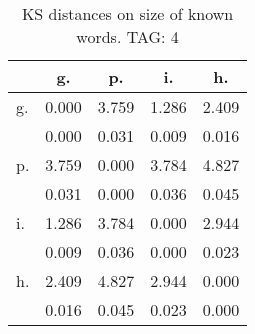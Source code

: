 \begin{table}[h!]
\begin{center}
\begin{tabular}{| l | c | c | c | c |}\hline
 & g. & p. & i. & h. \\\hline
g. & 0.000  & 3.759  & 1.286  & 2.409 \\\hline
 & 0.000  & 0.031  & 0.009  & 0.016 \\\hline
p. & 3.759  & 0.000  & 3.784  & 4.827 \\\hline
 & 0.031  & 0.000  & 0.036  & 0.045 \\\hline
i. & 1.286  & 3.784  & 0.000  & 2.944 \\\hline
 & 0.009  & 0.036  & 0.000  & 0.023 \\\hline
h. & 2.409  & 4.827  & 2.944  & 0.000 \\\hline
 & 0.016  & 0.045  & 0.023  & 0.000 \\\hline
\end{tabular}
\caption{KS distances on size of known words. TAG: 4}
\end{center}
\end{table}